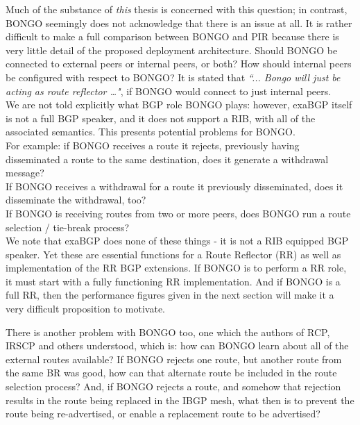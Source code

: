 Much of the substance of \emph{this} thesis is concerned with this question; in contrast, BONGO seemingly does not acknowledge that there is an issue at all.
It is rather difficult to make a full comparison between BONGO and PIR because there is very little detail of the proposed deployment architecture.
Should BONGO be connected to external peers or internal peers, or both?
How should internal peers be configured with respect to BONGO?
It is stated that
\emph{``... Bongo will just be acting as route reflector …"}, if BONGO would connect to just internal peers.
\\ We are not told explicitly what BGP role BONGO plays: however, exaBGP itself is not a full BGP speaker, and it does not support a RIB, with all of the associated semantics.  This presents potential problems for BONGO.
\\ For example: if BONGO receives a route it rejects, previously having disseminated a route to the same destination, does it generate a withdrawal message?
\\ If BONGO receives a withdrawal for a route it previously disseminated, does it disseminate the withdrawal, too?
\\ If BONGO is receiving routes from two or more peers, does BONGO run a route selection / tie-break process?
\\ We note that  exaBGP does none of these things - it is not a RIB equipped BGP speaker.
Yet these are essential functions for a Route Reflector (RR) as well as implementation of the RR BGP extensions.
If BONGO is to perform a RR role, it must start with a fully functioning RR implementation.
And if BONGO is a full RR, then the performance figures given in the next section will make it a very difficult proposition to motivate.

There is another problem with BONGO too, one which the authors of RCP, IRSCP and others understood, which is: how can BONGO learn about all of the external routes available?
If BONGO rejects one route, but another route from the same BR was good, how can that alternate route be included in the route selection process?
And, if BONGO rejects a route, and somehow that rejection results in the route being replaced in the IBGP mesh, what then is to prevent the route being re-advertised, or enable a replacement route to be advertised?
